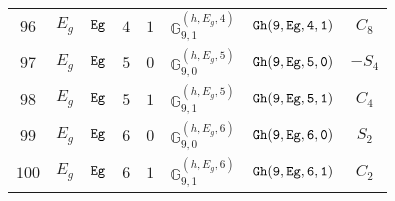 \documentclass[fleqn,8pt]{jsarticle}
\begin{document}
\begin{table}[ht!]
\begin{center}
\begin{tabular}{cccccccc}
$ 96 $ & $ E_{g} $ & $ {\tt Eg} $ & $ 4 $ & $ 1 $ & $ \mathbb{G}_{9,1}^{(h,E_{g},4)} $ & $ {\tt Gh(9,Eg,4,1)} $ & $ C_{8} $ \\
$ 97 $ & $ E_{g} $ & $ {\tt Eg} $ & $ 5 $ & $ 0 $ & $ \mathbb{G}_{9,0}^{(h,E_{g},5)} $ & $ {\tt Gh(9,Eg,5,0)} $ & $ - S_{4} $ \\
$ 98 $ & $ E_{g} $ & $ {\tt Eg} $ & $ 5 $ & $ 1 $ & $ \mathbb{G}_{9,1}^{(h,E_{g},5)} $ & $ {\tt Gh(9,Eg,5,1)} $ & $ C_{4} $ \\
$ 99 $ & $ E_{g} $ & $ {\tt Eg} $ & $ 6 $ & $ 0 $ & $ \mathbb{G}_{9,0}^{(h,E_{g},6)} $ & $ {\tt Gh(9,Eg,6,0)} $ & $ S_{2} $ \\
$ 100 $ & $ E_{g} $ & $ {\tt Eg} $ & $ 6 $ & $ 1 $ & $ \mathbb{G}_{9,1}^{(h,E_{g},6)} $ & $ {\tt Gh(9,Eg,6,1)} $ & $ C_{2} $ \\
 \hline \hline
\end{tabular}
\end{center}
\end{table}
\end{document}
